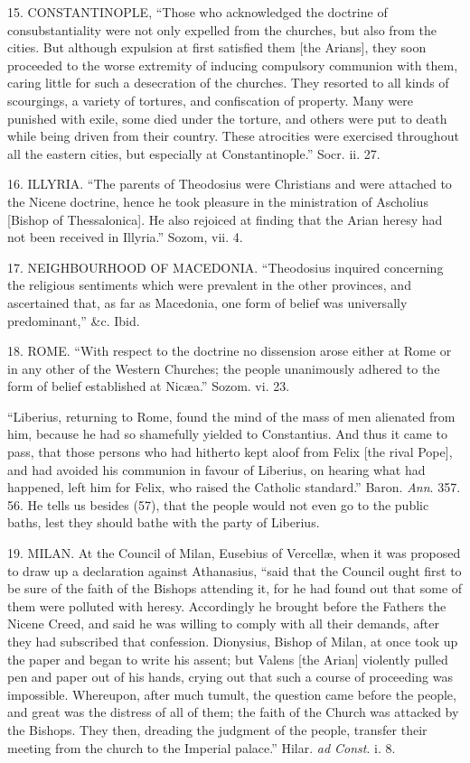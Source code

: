 15. CONSTANTINOPLE, ``Those who
acknowledged the doctrine of consubstantiality were not only expelled
from the churches, but also from the cities. But although expulsion at
first satisfied them [the Arians], they soon proceeded to the worse
extremity of inducing compulsory communion with them, caring little
for such a desecration of the churches. They resorted to all kinds of
scourgings, a variety of tortures, and confiscation of property. Many
were punished with exile, some died under the torture, and others were
put to death while being driven from their country. These atrocities
were exercised throughout all the eastern cities, but especially at
Constantinople.'' Socr. ii. 27.

16. ILLYRIA. ``The parents of Theodosius
were Christians and were attached to the Nicene doctrine, hence he
took pleasure in the ministration of Ascholius [Bishop of
Thessalonica]. He also rejoiced at finding that the Arian heresy had
not been received in Illyria.'' Sozom, vii. 4.

17. NEIGHBOURHOOD OF MACEDONIA.
``Theodosius inquired concerning the religious sentiments which
were prevalent in the other provinces, and ascertained that, as far as
Macedonia, one form of belief was universally predominant,''
\&c. Ibid.

18. ROME. ``With respect to the doctrine
no dissension arose either at Rome or in any other of the Western
Churches; the people unanimously adhered to the form of belief
established at Nicæa.'' Sozom. vi. 23.

``Liberius, returning to Rome, found the mind of the mass of
men alienated from him, because he had so shamefully yielded to
Constantius. And thus it came to pass, that those persons who had
hitherto kept aloof from Felix [the rival Pope], and had avoided his
communion in favour of Liberius, on hearing what had happened, left
him for Felix, who raised the Catholic standard.'' Baron. \emph{Ann}.
357. 56. He tells us besides (57), that the people would not even go
to the public baths, lest they should bathe with the party of Liberius.

19. MILAN. At the Council of Milan, Eusebius
of Vercellæ, when it was proposed to draw up a declaration against
Athanasius, ``said that the Council ought first to be sure of the
faith of the Bishops attending it, for he had found out that some of
them were polluted with heresy. Accordingly he brought before the
Fathers the Nicene Creed, and said he was willing to comply with all
their demands, after they had subscribed that confession. Dionysius,
Bishop of Milan, at once took up the paper and began to write his
assent; but Valens [the Arian] violently pulled pen and paper out of
his hands, crying out that such a course of proceeding was impossible.
Whereupon, after much tumult, the question came before the people, and
great was the distress of all of them; the faith of the Church was
attacked by the Bishops. They then, dreading the judgment of the
people, transfer their meeting from the church to the Imperial
palace.'' Hilar. \emph{ad Const}. i. 8.

